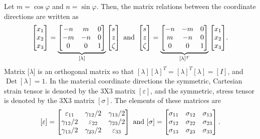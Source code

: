 \documentclass{AeroStructure-ERJohnson}
\begin{document}
\noindent Let $ m=\cos \varphi $ and $ n=\sin \varphi $. Then, the
matrix relations between the coordinate directions are written as
\begin{align}\label{eq8.6}
\left[\begin{array}{@{}l@{}} x_{1}\\
x_{2}\\
x_{3}
\end{array}\right]=\underbrace{\left[\begin{array}{@{}ccc@{}} -n &
m & 0\\
-m & -n & 0\\
0 & 0 & 1
\end{array}\right]}_{[\lambda]}\left[\begin{array}{@{}l@{}} s\\
z\\
\zeta \end{array}\right] \text { and
}\left[\begin{array}{@{}c@{}} s\\
z\\
\zeta
\end{array}\right]=\underbrace{\left[\begin{array}{@{}ccc@{}} -n &
-m & 0\\
m & -n & 0\\
0 & 0 & 1
\end{array}\right]}_{[\lambda]^{T}}\left[\begin{array}{@{}l@{}}
x_{1}\\
x_{2}\\
x_{3} \end{array}\right]\!.
\end{align}
Matrix [$\lambda$] is an orthogonal matrix so that
$[\lambda][\lambda]^{T}=[\lambda]^{T}[\lambda]=[I] $, and
$\operatorname{Det}[\lambda]=1$. In the material coordinate
directions the symmetric, Cartesian strain tensor is denoted by
the 3X3 matrix $[\varepsilon]$, and the symmetric, stress tensor
is denoted by the 3X3 matrix $[\sigma]$. The elements of these
matrices are
\begin{align}\label{eq8.7}
[\varepsilon]=\left[\begin{array}{@{}ccc@{}} \varepsilon_{11} &
\gamma_{12}/ 2 & \gamma_{13}/ 2\\
\gamma_{12}/ 2 &
\varepsilon_{22} & \gamma_{23}/ 2\\
\gamma_{13}/ 2 &
\gamma_{23}/ 2 & \varepsilon_{33} \end{array}\right] \mbox{ and }
[\sigma]=\left[\begin{array}{@{}lll@{}} \sigma_{11} & \sigma_{12}
&
\sigma_{13}\\
\sigma_{12} & \sigma_{22} & \sigma_{23}\\
\sigma_{13} & \sigma_{23} & \sigma_{33}
\end{array}\right].
\end{align}
\end{document}
